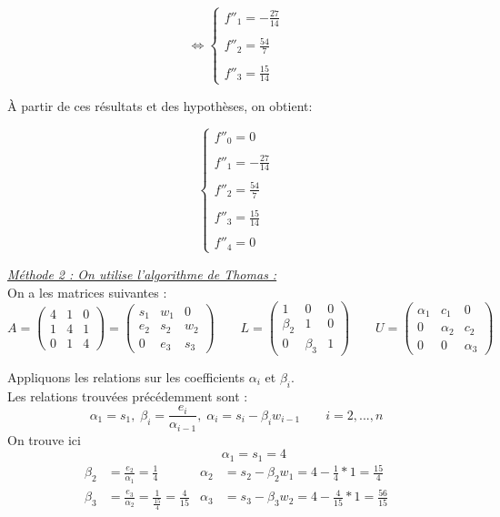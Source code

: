 \documentclass{article}
\begin{document}
\begin{addmargin}[16em]{-25em}
\[\Leftrightarrow
\left\{\begin{array}{ll}
f''_1=-\frac{27}{14}\\
\\
f''_2=\frac{54}{7}\\
\\
f''_3=\frac{15}{14}
\end{array}\right.\]
\end{addmargin}
\begin{flushleft}
	\`A partir de ces r\'{e}sultats et des hypoth\`{e}ses, on obtient:
\end{flushleft}
\[\left\{\begin{array}{ll}
f''_0= 0\\\\
f''_1=-\frac{27}{14}\\\\
f''_2= \frac{54}{7}\\\\
f''_3 = \frac{15}{14}\\\\
f''_4 = 0
 \end{array}\right.\]

\newpage
\begingroup\raggedleft
\underline{\textit{M\'{e}thode 2 : On utilise l'algorithme de Thomas :}}
\endgroup
\\[10pt]
On a les matrices suivantes :
\\[5pt]
\[A=\begin{pmatrix}
4 & 1 & 0\\
1 & 4 & 1\\
0 & 1 & 4
\end{pmatrix}
=\begin{pmatrix}
s_1 & w_1 & 0\\
e_2 & s_2 & w_2\\
0 & e_3 & s_3
\end{pmatrix}
\qquad
L=\begin{pmatrix}
1 & 0 & 0\\
\beta_2 & 1 & 0\\
0 & \beta_3 & 1
\end{pmatrix}
\qquad
U=\begin{pmatrix}
\alpha_1 & c_1 & 0\\
0 & \alpha_2 & c_2\\
0 & 0 & \alpha_3
\end{pmatrix}
\]

\begingroup\raggedleft
Appliquons les relations sur les coefficients $\alpha_i$ et $\beta_i$.
\endgroup
\\
Les relations trouv\'{e}es pr\'{e}c\'{e}demment sont :
\[\alpha_1=s_1,\; \beta_i=\frac{e_i}{\alpha_{i-1}},\; \alpha_i=s_i-\beta_{i}w_{i-1} \qquad i=2,...,n\]
\begingroup\raggedleft
On trouve ici 
\endgroup
\[\;\;\;\;\;\;\;\;\;\; \alpha_1= s_1 = 4\]
\begin{align*}
\beta_2& = \frac{e_2}{\alpha_{1}} = \frac{1}{4} & \alpha_2&= s_2-\beta_{2}w_{1} = 4 - \frac{1}{4} * 1= \frac{15}{4}
\\[5pt]
\beta_3&= \frac{e_3}{\alpha_{2}} = \frac{1}{\frac{15}{4}}= \frac{4}{15} & \alpha_3&= s_3-\beta_{3}w_{2} = 4 - \frac{4}{15} * 1 = \frac{56}{15}
\end{align*}
\end{document}
